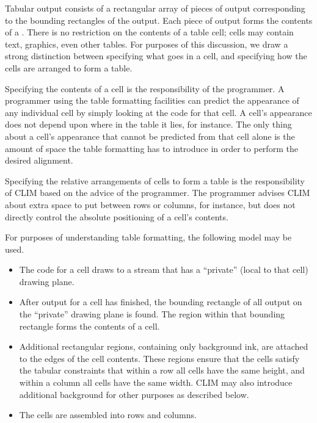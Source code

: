 Tabular output consists of a rectangular array of pieces of output corresponding
to the bounding rectangles of the output.  Each piece of output forms the
contents of a .  There is no restriction on the contents of
a table cell; cells may contain text, graphics, even other tables.  For purposes
of this discussion, we draw a strong distinction between specifying what goes in
a cell, and specifying how the cells are arranged to form a table.

Specifying the contents of a cell is the responsibility of the programmer.  A
programmer using the table formatting facilities can predict the appearance of
any individual cell by simply looking at the code for that cell.  A cell's
appearance does not depend upon where in the table it lies, for instance.  The
only thing about a cell's appearance that cannot be predicted from that cell
alone is the amount of space the table formatting has to introduce in order to
perform the desired alignment.

Specifying the relative arrangements of cells to form a table is the
responsibility of CLIM based on the advice of the programmer.  The programmer
advises CLIM about extra space to put between rows or columns, for instance, but
does not directly control the absolute positioning of a cell's contents.

For purposes of understanding table formatting, the following model may
be used.
\begin{itemize}
\item The code for a cell draws to a stream that has a ``private''  (local to
that cell) drawing plane.

\item After output for a cell has finished, the bounding rectangle of all output
on the ``private'' drawing plane is found.  The region within that bounding
rectangle forms the contents of a cell.

\item Additional rectangular regions, containing only background ink, are
attached to the edges of the cell contents.  These regions ensure that the
cells satisfy the tabular constraints that within a row all cells have the same
height, and within a column all cells have the same width.  CLIM may also
introduce additional background for other purposes as described below.

\item The cells are assembled into rows and columns.
\end{itemize}

